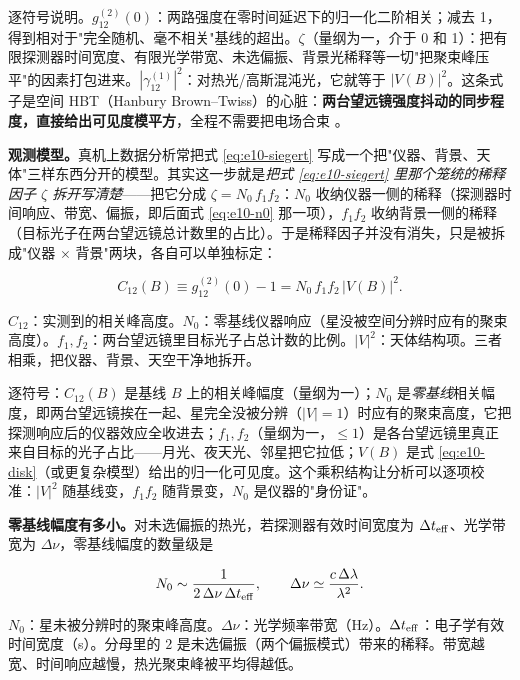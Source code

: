 逐符号说明。\(g_{12}^{(2)}(0)\)：两路强度在零时间延迟下的归一化二阶相关；减去 1，得到相对于"完全随机、毫不相关"基线的超出。\(\zeta\)（量纲为一，介于 0 和 1）：把有限探测器时间宽度、有限光学带宽、未选偏振、背景光稀释等一切"把聚束峰压平"的因素打包进来。\(|\gamma_{12}^{(1)}|^2\)：对热光/高斯混沌光，它就等于 \(|V(B)|^2\)。这条式子是空间 HBT（Hanbury Brown--Twiss）的心脏：\textbf{两台望远镜强度抖动的同步程度，直接给出可见度模平方}，全程不需要把电场合束 \citep{1956Natur.177...27B}。

\textbf{观测模型。}真机上数据分析常把式 \eqref{eq:e10-siegert} 写成一个把"仪器、背景、天体"三样东西分开的模型。其实这一步就是\emph{把式 \eqref{eq:e10-siegert} 里那个笼统的稀释因子 \(\zeta\) 拆开写清楚}——把它分成 \(\zeta=N_0\,f_1 f_2\)：\(N_0\) 收纳仪器一侧的稀释（探测器时间响应、带宽、偏振，即后面式 \eqref{eq:e10-n0} 那一项），\(f_1 f_2\) 收纳背景一侧的稀释（目标光子在两台望远镜总计数里的占比）。于是稀释因子并没有消失，只是被拆成"仪器 \(\times\) 背景"两块，各自可以单独标定：

\begin{equation}
  C_{12}(B)\equiv g_{12}^{(2)}(0)-1=N_0\,f_1 f_2\,\big|V(B)\big|^2 .
  \label{eq:e10-model}
\end{equation}
\begin{formulaexplain}
\(C_{12}\)：实测到的相关峰高度。\(N_0\)：零基线仪器响应（星没被空间分辨时应有的聚束高度）。\(f_1,f_2\)：两台望远镜里目标光子占总计数的比例。\(|V|^2\)：天体结构项。三者相乘，把仪器、背景、天空干净地拆开。
\end{formulaexplain}

逐符号：\(C_{12}(B)\) 是基线 \(B\) 上的相关峰幅度（量纲为一）；\(N_0\) 是\emph{零基线}相关幅度，即两台望远镜挨在一起、星完全没被分辨（\(|V|=1\)）时应有的聚束高度，它把探测响应后的仪器效应全收进去；\(f_1,f_2\)（量纲为一，\(\le1\)）是各台望远镜里真正来自目标的光子占比——月光、夜天光、邻星把它拉低；\(V(B)\) 是式 \eqref{eq:e10-disk}（或更复杂模型）给出的归一化可见度。这个乘积结构让分析可以逐项校准：\(|V|^2\) 随基线变，\(f_1f_2\) 随背景变，\(N_0\) 是仪器的"身份证"。

\textbf{零基线幅度有多小。}对未选偏振的热光，若探测器有效时间宽度为 \(\Delta t_{\rm eff}\)、光学带宽为 \(\Delta\nu\)，零基线幅度的数量级是

\begin{equation}
  N_0\sim\frac{1}{2\,\Delta\nu\,\Delta t_{\rm eff}},\qquad
  \Delta\nu\simeq\frac{c\,\Delta\lambda}{\lambda^2}.
  \label{eq:e10-n0}
\end{equation}
\begin{formulaexplain}
\(N_0\)：星未被分辨时的聚束峰高度。\(\Delta\nu\)：光学频率带宽（Hz）。\(\Delta t_{\rm eff}\)：电子学有效时间宽度（s）。分母里的 \(2\) 是未选偏振（两个偏振模式）带来的稀释。带宽越宽、时间响应越慢，热光聚束峰被平均得越低。
\end{formulaexplain}

